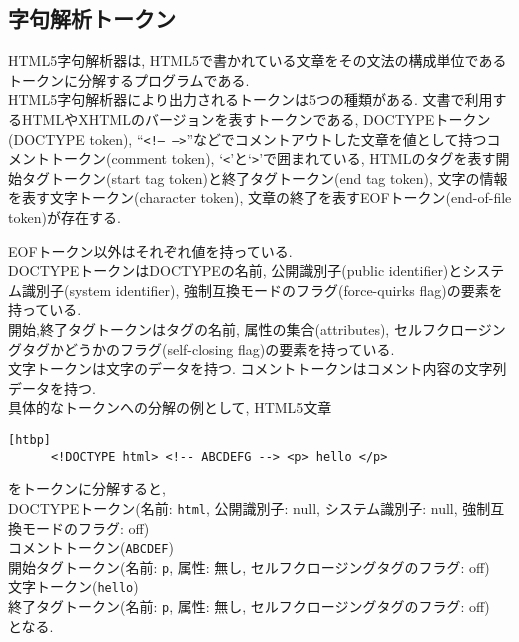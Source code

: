 \documentclass[uplatex,a4j]{jsreport}
\begin{document}
\subsection*{字句解析トークン}
HTML5字句解析器は, HTML5で書かれている文章をその文法の構成単位であるトークンに分解するプログラムである.\\
HTML5字句解析器により出力されるトークンは5つの種類がある.
文書で利用するHTMLやXHTMLのバージョンを表すトークンである, DOCTYPEトークン(DOCTYPE token), 
``\texttt{<!-- -->}''などでコメントアウトした文章を値として持つコメントトークン(comment token), 
`\texttt{<}'と`\texttt{>}'で囲まれている, HTMLのタグを表す開始タグトークン(start tag token)と終了タグトークン(end tag token), 
文字の情報を表す文字トークン(character token), 文章の終了を表すEOFトークン(end-of-file token)が存在する.

EOFトークン以外はそれぞれ値を持っている.\\
DOCTYPEトークンはDOCTYPEの名前,  公開識別子(public identifier)とシステム識別子(system identifier), 強制互換モードのフラグ(force-quirks flag)の要素を持っている.\\
開始,終了タグトークンはタグの名前, 属性の集合(attributes), セルフクロージングタグかどうかのフラグ(self-closing flag)の要素を持っている.\\
文字トークンは文字のデータを持つ. 
コメントトークンはコメント内容の文字列データを持つ.\\

具体的なトークンへの分解の例として, HTML5文章
\begin{lstlisting}[basicstyle=\ttfamily\footnotesize, frame=single][htbp]
      <!DOCTYPE html> <!-- ABCDEFG --> <p> hello </p>
\end{lstlisting}
をトークンに分解すると, \\
DOCTYPEトークン(名前: \texttt{html}, 公開識別子: null, システム識別子: null, 強制互換モードのフラグ: off)\\
コメントトークン(\texttt{ABCDEF})\\
開始タグトークン(名前: \texttt{p}, 属性: 無し, セルフクロージングタグのフラグ: off)\\
文字トークン(\texttt{hello})\\
終了タグトークン(名前: \texttt{p}, 属性: 無し, セルフクロージングタグのフラグ: off)\\
となる. \\
\end{document}

